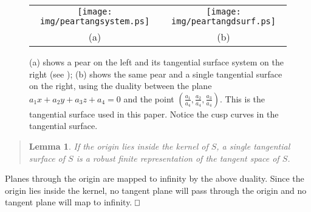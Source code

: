 \documentclass[twoside]{article}
\newtheorem{lemmaenv}{Lemma}
\newenvironment{lemma}{\begin{quote}\begin{lemmaenv}}%
                           {\end{lemmaenv}\end{quote}}
\newcommand{\prf}{\noindent{{\bf Proof}:\ \ \ }}
\def\qed{\hbox{${\vcenter{\vbox{			%
   \hrule height 0.4pt\hbox{\vrule width 0.4pt height 6pt
   \kern5pt\vrule width 0.4pt}\hrule height 0.4pt}}}$}}
\begin{document}
\begin{figure}[htbp]
\vspace*{14pt}

    \begin{center}
    \begin{tabular}{cc}
    \mbox{\hspace{-0.1in}}
    \texttt{[image: img/peartangsystem.ps]}  & 
    \mbox{\hspace{-0.2in}}
    \texttt{[image: img/peartangdsurf.ps]} \\[-0.0in]
    {(a)}  &  {(b)}
    \end{tabular}
    \end{center}

\caption{(a) shows a pear on the left and its tangential surface system
 on the right (see \cite{8});
(b) shows the same pear and a single tangential surface on the right,
using the duality between the plane $a_1x + a_2y + a_3z + a_4=0$ and the point
$\left(\frac{a_1}{a_4},\frac{a_2}{a_4},\frac{a_3}{a_4}\right)$.
This is the tangential surface used in this paper.
Notice the cusp curves in the tangential surface.}
\label{fig:peartang}
\end{figure}



\begin{lemma}
\label{lem:drobust}
If the origin lies inside the kernel of $S$,
a single tangential surface of $S$ is a robust finite representation of
the tangent space of $S$.
\end{lemma}
\prf
Planes through the origin are mapped to infinity by the above duality.
Since the origin lies inside the kernel,
no tangent plane will pass through the origin and no tangent plane will map to infinity.
\qed\,


\end{document}
